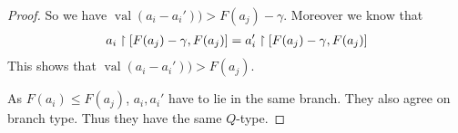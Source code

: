 \documentclass{amsart}
\DeclareMathOperator{\val}{val}
\begin{document}
\begin{proof}
	So we have $\val(a_i - a_i')) > F(a_j) - \gamma$.
	Moreover we know that
	\begin{align*}
		a_i \upharpoonright [F(a_j) - \gamma, F(a_j)] = a_i' \upharpoonright [F(a_j) - \gamma, F(a_j)]
	\end{align*}
	This shows that $\val(a_i - a_i')) > F(a_j)$.

	As $F(a_i) \leq F(a_j)$, $a_i, a_i'$ have to lie in the same branch.
	They also agree on branch type.
	Thus they have the same $Q$-type.
\end{proof}
\end{document}
